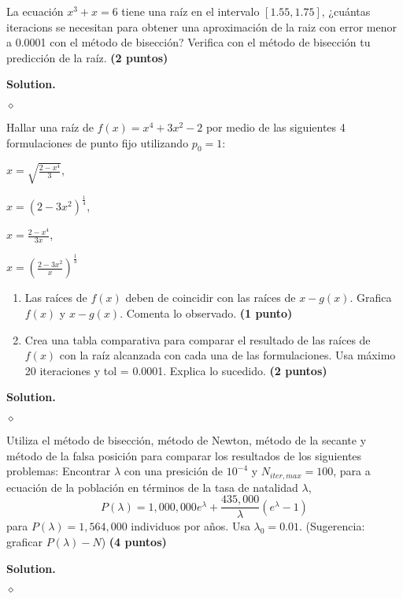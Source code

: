 \documentclass{article}
\theoremstyle{problemstyle}
\newenvironment{solution}{%
  \begin{mdframed}[linewidth=0.8pt,linecolor=Gray,backgroundcolor=Gray!5,roundcorner=5pt]%
  \noindent\textbf{Solution.}%
}{%
\hfill $ \diamond $ 
  \end{mdframed}%
}
\begin{document}
\begin{problem}
La ecuaci\'on $ x^3+x = 6 $ tiene una ra\'iz en el intervalo $ [1.55, 1.75] $, ¿cu\'antas iteracions se necesitan para obtener una aproximaci\'on de la raiz con error menor a 0.0001 con el m\'etodo de bisecci\'on? Verifica con el m\'etodo de bisecci\'on tu predicci\'on de la ra\'iz. \textbf{(2 puntos)}
\end{problem}
\begin{solution}
	
\end{solution}

\begin{problem}
Hallar una ra\'iz de $ f(x) = x^4 + 3x^2 - 2 $ por medio de las siguientes 4 formulaciones de punto fijo utilizando $ p_0 = 1 $:
\begin{center}
	\begin{enumerate*}[label=\alph*),itemjoin=\qquad]

		\item $\displaystyle x = \sqrt{\frac{2-x^4}{3}} $,
		\item $\displaystyle x = (2-3x^2)^{\frac{1}{4}}$,
		\item $\displaystyle x = \frac{2-x^4}{3x} $,
		\item $\displaystyle x = \left(\frac{2-3x^2}{x}\right)^{\frac{1}{3}}$
	\end{enumerate*}
\end{center}

\begin{enumerate}
	\item Las ra\'ices de $ f(x) $ deben de coincidir con las ra\'ices de $ x-g(x) $. Grafica $ f(x) $ y $ x-g(x) $. Comenta lo observado. \textbf{(1 punto)}

  \item Crea una tabla comparativa para comparar el resultado de las ra\'ices de $f(x) $ con la ra\'iz alcanzada con cada una de las formulaciones. Usa m\'aximo 20 iteraciones y tol = 0.0001. Explica lo sucedido. \textbf{(2 puntos)}
\end{enumerate}
\end{problem}
\begin{solution}
	
\end{solution}

\begin{problem}
Utiliza el m\'etodo de bisecci\'on, m\'etodo de Newton, m\'etodo de la secante y m\'etodo de la falsa posici\'on para comparar los resultados de los siguientes problemas:
Encontrar $ \lambda $ con una presici\'on de $ 10^{-4} $ y $ N_{iter, max} = 100 $, para a ecuaci\'on de la poblaci\'on en t\'erminos de la tasa de natalidad $ \lambda $,
\[
	P(\lambda) = 1,000,000 e^{\lambda} + \frac{435,000}{\lambda}(e^{\lambda} - 1)
\]
para $ P(\lambda) = 1,564,000 $ individuos por a\~nos. Usa $ \lambda_0 = 0.01 $. (Sugerencia: graficar $ P(\lambda) - N $) \textbf{(4 puntos)}
\end{problem}

\begin{solution}
	
\end{solution}



\end{document}
